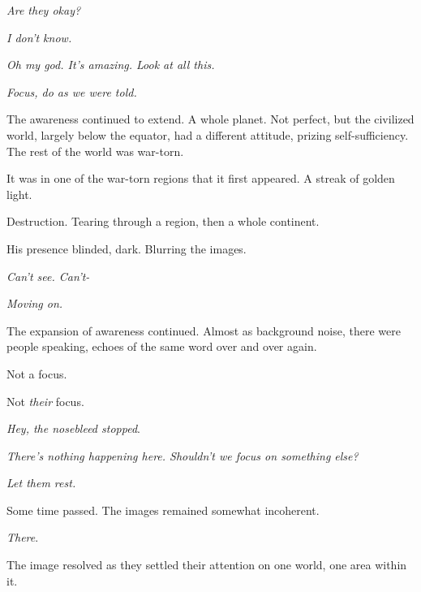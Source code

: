 \emph{Are they okay?}



\emph{I don't know.}



\emph{Oh my god.  It's amazing.  Look at all this.}



\emph{Focus, do as we were told.}



The awareness continued to extend.  A whole planet.  Not perfect, but the civilized world, largely below the equator, had a different attitude, prizing self-sufficiency.  The rest of the world was war-torn.



It was in one of the war-torn regions that it first appeared.  A streak of golden light.



Destruction.  Tearing through a region, then a whole continent.



His presence blinded, dark.  Blurring the images.



\emph{Can't see.  Can't-}



\emph{Moving on.}



\blacksquare



The expansion of awareness continued.  Almost as background noise, there were people speaking, echoes of the same word over and over again.



Not a focus.



Not \emph{their} focus.



\emph{Hey, the nosebleed stopped}.



\emph{There's nothing happening here.  Shouldn't we focus on something else?}



\emph{Let them rest.}



Some time passed.  The images remained somewhat incoherent.



\emph{There}.



The image resolved as they settled their attention on one world, one area within it.



